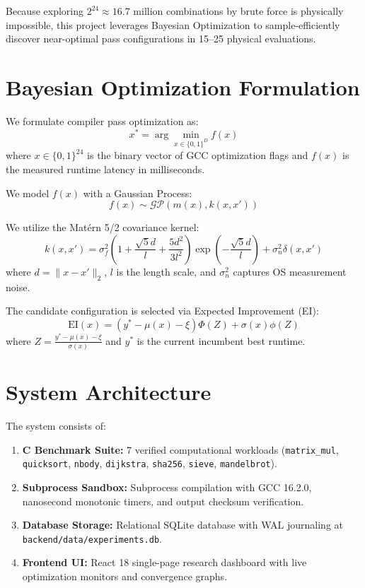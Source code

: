 \documentclass[sigconf,nonacm]{acmart}
\begin{document}
Because exploring $2^{24} \approx 16.7\text{ million}$ combinations by brute force is physically impossible, this project leverages Bayesian Optimization to sample-efficiently discover near-optimal pass configurations in 15--25 physical evaluations.

\section{Bayesian Optimization Formulation}
We formulate compiler pass optimization as:
\begin{equation}
x^* = \arg\min_{x \in \{0, 1\}^D} f(x)
\end{equation}
where $x \in \{0, 1\}^{24}$ is the binary vector of GCC optimization flags and $f(x)$ is the measured runtime latency in milliseconds.

We model $f(x)$ with a Gaussian Process:
\begin{equation}
f(x) \sim \mathcal{GP}\left(m(x), k(x, x')\right)
\end{equation}

We utilize the Mat\'ern 5/2 covariance kernel:
\begin{equation}
k(x, x') = \sigma_f^2 \left(1 + \frac{\sqrt{5}d}{l} + \frac{5d^2}{3l^2}\right) \exp\left(-\frac{\sqrt{5}d}{l}\right) + \sigma_n^2 \delta(x, x')
\end{equation}
where $d = \|x - x'\|_2$, $l$ is the length scale, and $\sigma_n^2$ captures OS measurement noise.

The candidate configuration is selected via Expected Improvement (EI):
\begin{equation}
\text{EI}(x) = (y^* - \mu(x) - \xi)\Phi(Z) + \sigma(x)\phi(Z)
\end{equation}
where $Z = \frac{y^* - \mu(x) - \xi}{\sigma(x)}$ and $y^*$ is the current incumbent best runtime.

\section{System Architecture}
The system consists of:
\begin{enumerate}
    \item \textbf{C Benchmark Suite:} 7 verified computational workloads (\texttt{matrix\_mul}, \texttt{quicksort}, \texttt{nbody}, \texttt{dijkstra}, \texttt{sha256}, \texttt{sieve}, \texttt{mandelbrot}).
    \item \textbf{Subprocess Sandbox:} Subprocess compilation with GCC 16.2.0, nanosecond monotonic timers, and output checksum verification.
    \item \textbf{Database Storage:} Relational SQLite database with WAL journaling at \texttt{backend/data/experiments.db}.
    \item \textbf{Frontend UI:} React 18 single-page research dashboard with live optimization monitors and convergence graphs.
\end{enumerate}
\end{document}
